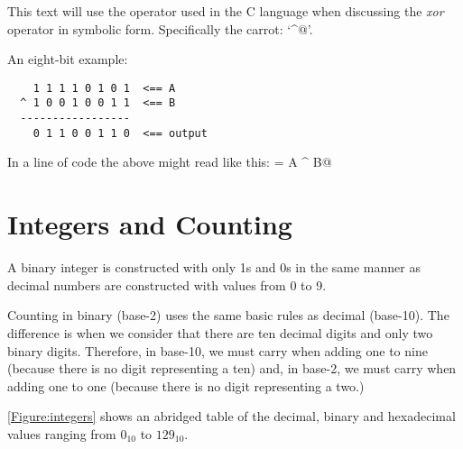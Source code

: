 This text will use the operator used in the C language when discussing
the {\em xor}  operator in symbolic form.  Specifically the carrot: `\verb@^@'.


An eight-bit example:

\begin{verbatim}
    1 1 1 1 0 1 0 1  <== A
  ^ 1 0 0 1 0 0 1 1  <== B
  -----------------
    0 1 1 0 0 1 1 0  <== output
\end{verbatim}

In a line of code the above might read like this: \verb@output = A ^ B@


\section{Integers and Counting}

A binary integer is constructed with only 1s and 0s in the same
manner as decimal numbers are constructed with values from 0 to 9.

Counting in binary (base-2) uses the same basic rules as decimal (base-10).  
The difference is when we consider that there are ten decimal digits and 
only two binary digits.  Therefore, in base-10, we must carry when adding one to 
nine (because there is no digit representing a ten) and, in base-2, we must 
carry when adding one to one (because there is no digit representing a two.)

\autoref{Figure:integers} shows an abridged table of the decimal, binary and 
hexadecimal values ranging from $0_{10}$ to $129_{10}$.

